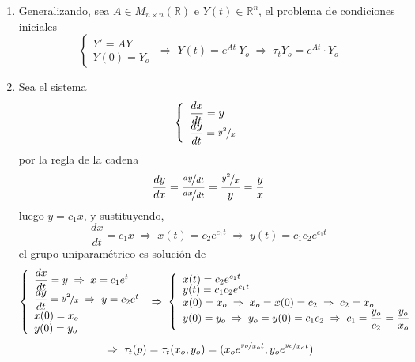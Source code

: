 \begin{ejes}
\begin{enumerate}
\item Generalizando, sea $A \in M_{n \times n} (\mathbb R)$ e $Y(t)\in \mathbb R^n$, el problema de condiciones iniciales
        $$\left\{ \begin{array}{l}
             Y'=AY  \\
             Y(0)=Y_o 
        \end{array}\right. \; \Rightarrow \; Y(t)=e^{At} \: Y_o \; \Rightarrow \; \tau_t Y_o=e^{At} \cdot Y_o$$
\item Sea el sistema 
 $$\left\{ \begin{array}{l}
              \dfrac{dx}{dt} = y \\
              \vspace{-5mm} \\
             \dfrac{dy}{dt} = \nicefrac{y^2}{x}
\end{array} \right.$$
por la regla de la cadena
$$\dfrac{dy}{dx}=\dfrac{\nicefrac{dy}{dt}}{\nicefrac{dx}{dt}}=\dfrac{\nicefrac{y^2}{x}}{y}=\dfrac{y}{x}$$
luego $y=c_1x$, y sustituyendo, 
$$\dfrac{dx}{dt}=c_1x \; \Rightarrow \; x(t)=c_2 e^{c_1t} \; \Rightarrow \; y(t)=c_1 c_2 e^{c_1t}$$
el grupo uniparamétrico es solución de
             $$\left\{ \begin{array}{l}
              \dfrac{dx}{dt} = y \; \Rightarrow \; x=c_1e^t  \\
              \vspace{-5mm} \\
             \dfrac{dy}{dt} = \nicefrac{y^2}{x} \; \Rightarrow \; y=c_2e^t \\
             x(0) = x_o \\
             y(0) = y_o
\end{array} \right. \; \Rightarrow \;\left\{ \begin{array}{l}
              x(t)=c_2 e^{c_1t}  \\
              \vspace{-5mm} \\
             y(t)=c_1 c_2 e^{c_1t} \\
             x(0) = x_o \; \Rightarrow \; x_o=x(0)=c_2 \; \Rightarrow \; c_2 = x_o\\
             y(0) = y_o \; \Rightarrow \; y_o=y(0)=c_1c_2 \; \Rightarrow \; c_1 = \dfrac{y_o}{c_2}=\dfrac{y_o}{x_o}
\end{array} \right. $$
$$\; \Rightarrow \;  \tau_t(p)=\tau_t(x_o,y_o)=(x_o e^{\nicefrac{y_o}{x_o}t},y_o e^{\nicefrac{y_o}{x_o}t})$$
        \end{enumerate}
    \end{ejes}
